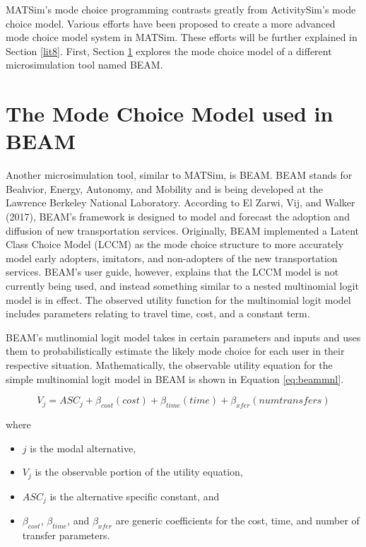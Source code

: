 \documentclass[12pt, oneside, openright]{byuthesis}
\providecommand{\tightlist}{%
  \setlength{\itemsep}{0pt}\setlength{\parskip}{0pt}}
\begin{document}
MATSim's mode choice programming contrasts greatly from ActivitySim's mode choice model. Various efforts have been proposed to create a more advanced mode choice model system in MATSim. These efforts will be further explained in Section \ref{lit8}. First, Section \ref{lit7} explores the mode choice model of a different microsimulation tool named BEAM.

\hypertarget{lit7}{%
\section{The Mode Choice Model used in BEAM}\label{lit7}}

Another microsimulation tool, similar to MATSim, is BEAM. BEAM stands for Beahvior, Energy, Autonomy, and Mobility and is being developed at the Lawrence Berkeley National Laboratory. According to El Zarwi, Vij, and Walker (2017), BEAM's framework is designed to model and forecast the adoption and diffusion of new transportation services. Originally, BEAM implemented a Latent Class Choice Model (LCCM) as the mode choice structure to more accurately model early adopters, imitators, and non-adopters of the new transportation services. BEAM's user guide, however, explains that the LCCM model is not currently being used, and instead something similar to a nested multinomial logit model is in effect. The observed utility function for the multinomial logit model includes parameters relating to travel time, cost, and a constant term.

BEAM's mutlinomial logit model takes in certain parameters and inputs and uses them to probabilistically estimate the likely mode choice for each user in their respective situation. Mathematically, the observable utility equation for the simple multinomial logit model in BEAM is shown in Equation \eqref{eq:beammnl}.

\begin{equation}
  V_j = ASC_j + \beta_{cost}(cost) + \beta_{time}(time) + \beta_{xfer}(numtransfers) 
    \label{eq:beammnl}
\end{equation}

where

\begin{itemize}
\tightlist
\item
  \(j\) is the modal alternative,
\item
  \(V_j\) is the observable portion of the utility equation,
\item
  \(ASC_j\) is the alternative specific constant, and
\item
  \(\beta_{cost}\), \(\beta_{time}\), and \(\beta_{xfer}\) are generic coefficients for the cost, time, and number of transfer parameters.
\end{itemize}
\end{document}
